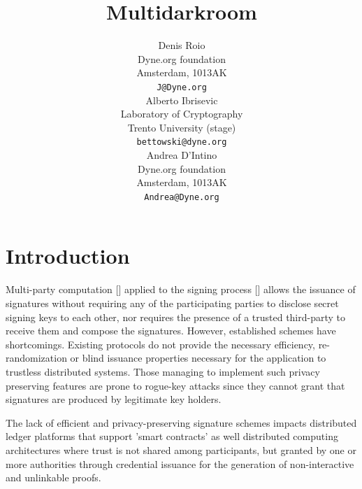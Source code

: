 \documentclass[twocolumn]{article}
\title{Multidarkroom}
\author{
    Denis Roio \\
	Dyne.org foundation \\
	Amsterdam, 1013AK \\
	\texttt{J@Dyne.org} \\
    \And
	Alberto Ibrisevic \\
	Laboratory of Cryptography\\
	Trento University (stage)\\
	\texttt{bettowski@dyne.org} \\
    \And
    Andrea D'Intino \\
    Dyne.org foundation \\
    Amsterdam, 1013AK \\
    \texttt{Andrea@Dyne.org} \\
}
\begin{document}



\section{Introduction}

Multi-party computation [] applied to the signing process [] allows
the issuance of signatures without requiring any of the participating
parties to disclose secret signing keys to each other, nor requires
the presence of a trusted third-party to receive them and compose the
signatures. However, established schemes have shortcomings. Existing
protocols do not provide the necessary efficiency, re-randomization or
blind issuance properties necessary for the application to trustless
distributed systems. Those managing to implement such privacy
preserving features are prone to rogue-key attacks \citep{ietf-bls}
since they cannot grant that signatures are produced by legitimate key
holders.

The lack of efficient and privacy-preserving signature schemes impacts
distributed ledger platforms that support 'smart contracts' as well
distributed computing architectures where trust is not shared among
participants, but granted by one or more authorities through
credential issuance for the generation of non-interactive and
unlinkable proofs.
\end{document}
